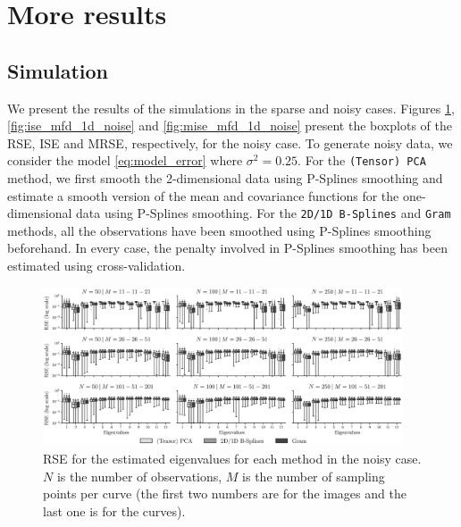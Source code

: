\section{More results} %
\label{sec:more_results}


\subsection{Simulation} %
\label{sub:simulation}

We present the results of the simulations in the sparse and noisy cases. Figures \ref{fig:logAE_mfd_1d_noise}, \ref{fig:ise_mfd_1d_noise} and \ref{fig:mise_mfd_1d_noise} present the boxplots of the RSE, ISE and MRSE, respectively, for the noisy case. To generate noisy data, we consider the model \eqref{eq:model_error} where $\sigma^2 = 0.25$. For the \texttt{(Tensor) PCA} method, we first smooth the 2-dimensional data using P-Splines smoothing and estimate a smooth version of the mean and covariance functions for the one-dimensional data using P-Splines smoothing. For the \texttt{2D/1D B-Splines} and \texttt{Gram} methods, all the observations have been smoothed using P-Splines smoothing beforehand. In every case, the penalty involved in P-Splines smoothing has been estimated using cross-validation.

\begin{figure}
    \centering
    \includegraphics[width=0.95\textwidth]{AE_noise}
    \caption{RSE for the estimated eigenvalues for each method in the noisy case. $N$ is the number of observations, $M$ is the number of sampling points per curve (the first two numbers are for the images and the last one is for the curves).}
    \label{fig:logAE_mfd_1d_noise}
\end{figure}

